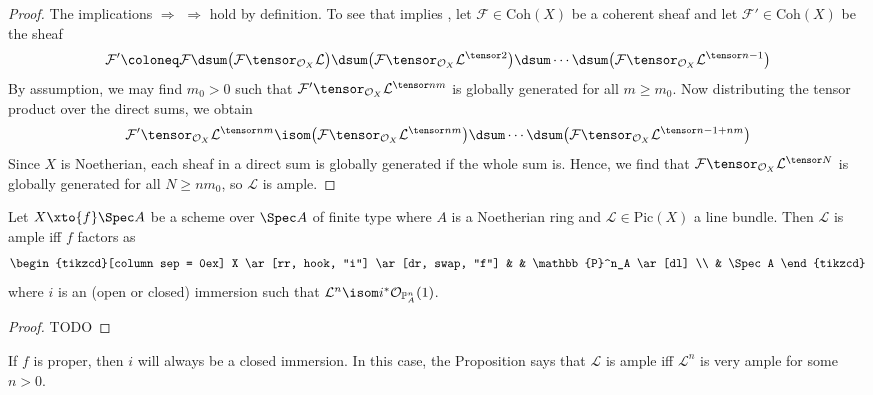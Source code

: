 \documentclass[wip, algebra]{bsteffan-lecturenotes}
\newcommand{\cO}{\mathcal{O}}
\newcommand{\cF}{\mathcal{F}}
\newcommand{\cL}{\mathcal{L}}
\renewcommand{\P}{\mathbb{P}}
\newcommand{\Pic}{\mathrm{Pic}}
\newcommand{\Coh}{\mathrm{Coh}}
\begin{document}
\begin{proof}
	The implications  $\Rightarrow$  $\Rightarrow$  hold by definition.
	To see that  implies , let $\cF \in \Coh(X)$ be a coherent sheaf and let $\cF' \in \Coh(X)$ be the sheaf
	\begin{equation*}
		\cF' \coloneq \cF \dsum \big(\cF \tensor_{\cO_X} \cL\big) \dsum \big(\cF \tensor_{\cO_X} \cL^{\tensor 2}\big) \dsum \cdots \dsum \big(\cF \tensor_{\cO_X} \cL^{\tensor n - 1}\big)
	\end{equation*}
	By assumption, we may find $m_0 > 0$ such that $\cF' \tensor_{\cO_X} \cL^{\tensor nm}$ is globally generated for all $m \geq m_0$.
	Now distributing the tensor product over the direct sums, we obtain
	\begin{equation*}
		\cF' \tensor_{\cO_X} \cL^{\tensor nm} \isom \big(\cF \tensor_{\cO_X} \cL^{\tensor nm}\big) \dsum \cdots \dsum \big(\cF \tensor_{\cO_X} \cL^{\tensor n - 1 + nm}\big)
	\end{equation*}
	Since $X$ is Noetherian, each sheaf in a direct sum is globally generated if the whole sum is. 
	Hence, we find that $\cF \tensor_{\cO_X} \cL^{\tensor N}$ is globally generated for all $N \geq n m_0$, so $\cL$ is ample.
\end{proof}
\begin{proposition}
	Let $X \xto{f} \Spec A$ be a scheme over $\Spec A$ of finite type where $A$ is a Noetherian ring and $\cL \in \Pic(X)$ a line bundle.
	Then $\cL$ is ample iff $f$ factors as 
	\begin{equation*}
		\begin{tikzcd}[column sep = 0ex]
			X
					\ar[rr, hook, "i"]
					\ar[dr, swap, "f"]
				& & \P^n_A
					\ar[dl]
			\\
				& \Spec A
		\end{tikzcd}
	\end{equation*}
	where $i$ is an (open or closed) immersion such that $\cL^n \isom i^* \cO_{\P^n_A}(1)$.
\end{proposition}
\begin{proof}
	TODO
\end{proof}
\begin{remark}
	If $f$ is proper, then $i$ will always be a closed immersion.
	In this case, the Proposition says that $\cL$ is ample iff $\cL^n$ is very ample for some $n > 0$. 
\end{remark}
\end{document}
